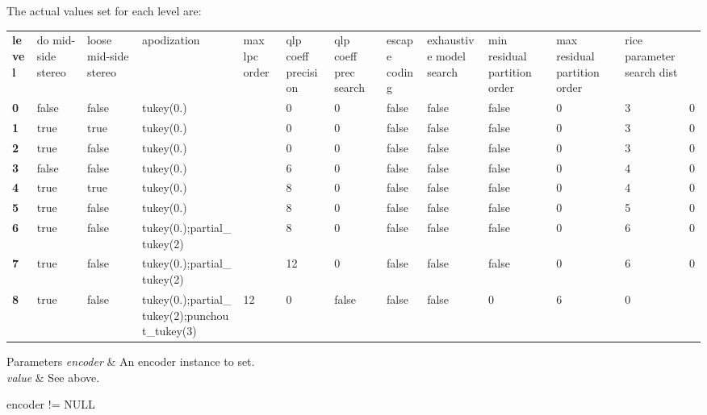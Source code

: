 The actual values set for each level are\+: \tabulinesep=1mm
\begin{longtabu} spread 0pt [c]{*{13}{|X[-1]}|}
\hline
{\bfseries level} &do mid-\/side stereo &loose mid-\/side stereo &apodization &max lpc order &qlp coeff precision &qlp coeff prec search &escape coding &exhaustive model search &min residual partition order &max residual partition order &rice parameter search dist  \\
{\bfseries 0} &false &false &tukey(0.)&&0 &0 &false &false &false &0 &3 &0  \\
{\bfseries 1} &true &true &tukey(0.)&&0 &0 &false &false &false &0 &3 &0  \\
{\bfseries 2} &true &false &tukey(0.)&&0 &0 &false &false &false &0 &3 &0  \\
{\bfseries 3} &false &false &tukey(0.)&&6 &0 &false &false &false &0 &4 &0  \\
{\bfseries 4} &true &true &tukey(0.)&&8 &0 &false &false &false &0 &4 &0  \\
{\bfseries 5} &true &false &tukey(0.)&&8 &0 &false &false &false &0 &5 &0  \\
{\bfseries 6} &true &false &tukey(0.);partial\+\_\+tukey(2)&&8 &0 &false &false &false &0 &6 &0  \\
{\bfseries 7} &true &false &tukey(0.);partial\+\_\+tukey(2)&&12 &0 &false &false &false &0 &6 &0  \\
{\bfseries 8} &true &false &tukey(0.);partial\+\_\+tukey(2);punchout\+\_\+tukey(3) &12 &0 &false &false &false &0 &6 &0  \\
\end{longtabu}


{} 
\begin{DoxyParams}{Parameters}
{\em encoder} & An encoder instance to set. \\
\hline
{\em value} & See above.  
\begin{DoxyCode}
encoder != NULL 
\end{DoxyCode}
 \\
\hline
\end{DoxyParams}


